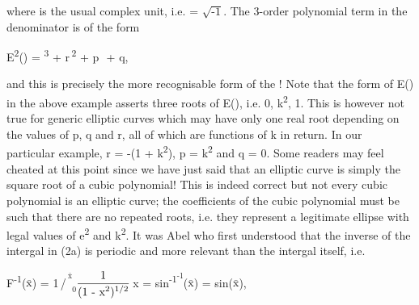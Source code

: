 \documentclass[a4paper,10pt]{article}
\begin{document}
\begin{flushleft}
{{\begin{center}
	\end{center}
	\begin{flushright}
		{\vspace{-8mm}}
	\end{flushright}
	where {} is the usual complex unit, i.e. {} = $\sqrt{\text{-1}}$. The 3-order polynomial term in the denominator is of the form
	\begin{center}
	{E\textsuperscript{2}(\uptheta)} = {\uptheta}\textsuperscript{3} + r\cdot\,{\uptheta}\textsuperscript{2} + p\,\cdot\,{\uptheta} + q,
	\end{center} 
	and this is precisely the more recognisable form of the {}! Note that the form of {E({\uptheta})} in the above example asserts three roots of {E(\uptheta)}, i.e. 0, k\textsuperscript{2}, 1. This is however not true for generic elliptic curves which may have only one real root depending on the values of p, q and r, all of which are functions of k in return. In our particular example, r = -(1 + k\textsuperscript{2}), p = k\textsuperscript{2} and q = 0. Some readers may feel cheated at this point since we have just said that an elliptic curve is simply the square root of a cubic polynomial! This is indeed correct but not every cubic polynomial is an elliptic curve; the coefficients of the cubic polynomial must be such that there are no repeated roots, i.e. they represent a legitimate ellipse with legal values of e\textsuperscript{2} and k\textsuperscript{2}.\linebreak\linebreak\linebreak
	\textbf{\Large{}}\linebreak\linebreak
	It was Abel who first understood that the inverse of the intergal in (2a) is periodic and more relevant than the intergal itself, i.e.
	\vspace{2mm}
	\begin{center}
	F\textsuperscript{-1}($\bar{\text{x}}$) = 1\,/\,{{\Large{}}\hspace{0.3mm}\textsuperscript{\textsuperscript{\scriptsize{$\bar{\text{x}}$}}}}{\hspace{-1.8mm}\textsubscript{\textsubscript{\scriptsize{0}}}}$\displaystyle\frac{\text{1}}{\text{(1 - x\textsuperscript{2})\textsuperscript{1/2}}}$\,{\updelta}x = sin\textsuperscript{-1\textsuperscript{\scriptsize{-1}}}($\bar{\text{x}}$) = sin($\bar{\text{x}}$),
	\end{center}
}}
\end{flushleft}
\end{document}
